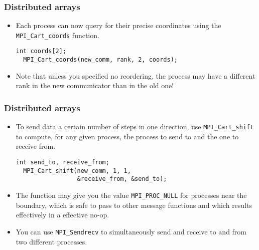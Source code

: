 \begin{frame}[fragile]
  \frametitle{Distributed arrays}
  \begin{itemize}
  \item Each process can now query for their precise coordinates using the
    \texttt{MPI\_Cart\_coords} function.
\begin{lstlisting}[style=c]
  int coords[2];
  MPI_Cart_coords(new_comm, rank, 2, coords);
\end{lstlisting}
  \item Note that unless you specified no reordering, the process may have a
    different rank in the new communicator than in the old one!
  \end{itemize}
\end{frame}

\begin{frame}[fragile]
  \frametitle{Distributed arrays}
  \begin{itemize}
  \item To send data a certain number of steps in one direction, use
    \texttt{MPI\_Cart\_shift} to compute, for any given process, the process to
    send to and the one to receive from.
\begin{lstlisting}[style=c]
  int send_to, receive_from;
  MPI_Cart_shift(new_comm, 1, 1,
                 &receive_from, &send_to);
\end{lstlisting}
  \item The function may give you the value \texttt{MPI\_PROC\_NULL} for
    processes near the boundary, which is safe to pass to other message
    functions and which results effectively in a effective no-op.
  \item You can use \texttt{MPI\_Sendrecv} to simultaneously send and receive to
    and from two different processes.
  \end{itemize}
\end{frame}


